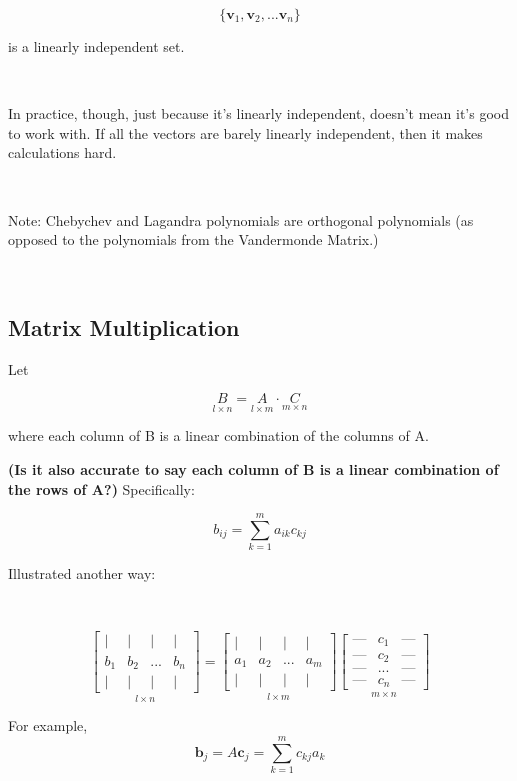 \documentclass[12pt]{article}
\newcommand\ssc[2][\DefaultOpt]{%
  \def\DefaultOpt{#2}%
  \subsection[#1]{#2}%
}
\newcommand{\eqn}[1]{\[#1\]}
\begin{document}
{{\eqn{\{\textbf{v}_1, \textbf{v}_2, ... \textbf{v}_n\}}

is a linearly independent set.

\

In practice, though, just because it's linearly independent, doesn't mean it's good to work with. If all the vectors are barely linearly independent, then it makes calculations hard.

\

Note: Chebychev and Lagandra polynomials are orthogonal polynomials (as opposed to the polynomials from the Vandermonde Matrix.)
}


\

\ssc{Matrix Multiplication}{

Let

\eqn{\underset{l \times n}{B} = \underset{l \times m}{A} \cdot \underset{m \times n}{C}}

where each column of B is a linear combination of the columns of A.

\textbf{(Is it also accurate to say each column of B is a linear combination of the rows of A?)} Specifically:

\eqn{b_{ij} = \sum_{k=1}^{m} a_{ik} c_{kj} }

Illustrated another way:

\

\begin{displaymath}
\underset{l \times n}{
\begin{bmatrix}
    \vert & \vert & \vert & \vert \\
    b_1 & b_2 & ... & b_n \\
    \vert & \vert & \vert & \vert
\end{bmatrix}
}
=
\underset{l \times m}{
\begin{bmatrix}
    \vert & \vert & \vert & \vert \\
    a_1 & a_2 & ... & a_m \\
    \vert & \vert & \vert & \vert
\end{bmatrix}
}
\underset{m \times n}{
\begin{bmatrix}
    \text{---} & c_1 & \text{---} \\
    \text{---} & c_2 & \text{---} \\
    \text{---} & ... & \text{---} \\
    \text{---} & c_n & \text{---}
\end{bmatrix}
}
\end{displaymath}

For example,
\eqn{\textbf{b}_j = A\textbf{c}_j = \sum_{k=1}^m c_{kj}a_k}

}}
\end{document}
